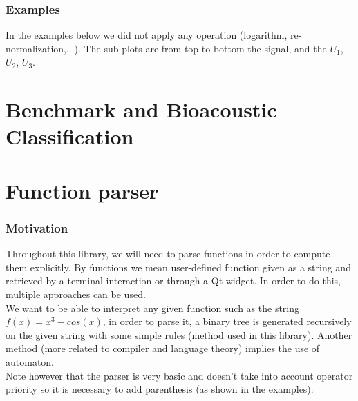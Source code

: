\documentclass[a4paper]{report}
\begin{document}
\section{Examples}
In the examples below we did not apply any operation (logarithm, re-normalization,...). The sub-plots are from top to bottom the
signal, and the $U_1$, $U_2$, $U_3$.

\part{Benchmark and Bioacoustic Classification}


\part{Function parser}
\section{Motivation}
Throughout this library, we will need to parse functions in order to compute them explicitly. By functions we mean user-defined function given as a string and retrieved by a terminal interaction or through a Qt widget. In order to do this, multiple approaches can be used.\\
We want to be able to interpret any given function such as the string $f(x)=x^3-cos(x)$, in order to parse it, a binary tree is generated recursively on the given string with some simple rules (method used in this library). Another method (more related to compiler and language theory) implies the use of automaton.
\\
Note however that the parser is very basic and doesn't take into account operator priority so it is necessary to add parenthesis (as shown in the examples).
\end{document}

